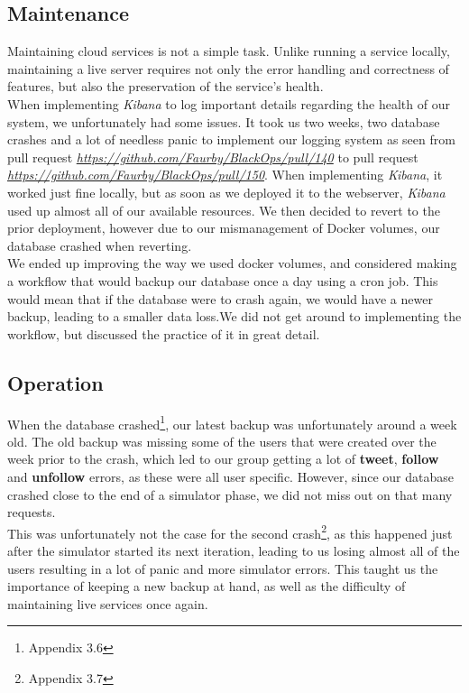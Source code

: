 \subsection{Maintenance}
Maintaining cloud services is not a simple task. Unlike running a service locally, maintaining a live server requires not only the error handling and correctness of features, but also the preservation of the service's health. \\
When implementing \textit{Kibana} to log important details regarding the health of our system, we unfortunately had some issues. It took us two weeks, two database crashes and a lot of needless panic to implement our logging system as seen from pull request \textit{\url{https://github.com/Faurby/BlackOps/pull/140}} to pull request \textit{\url{https://github.com/Faurby/BlackOps/pull/150}}. When implementing \textit{Kibana}, it worked just fine locally, but as soon as we deployed it to the webserver, \textit{Kibana} used up almost all of our available resources. We then decided to revert to the prior deployment, however due to our mismanagement of Docker volumes, our database crashed when reverting. \\
We ended up improving the way we used docker volumes, and considered making a workflow that would backup our database once a day using a cron job. This would mean that if the database were to crash again, we would have a newer backup, leading to a smaller data loss.We did not get around to implementing the workflow, but discussed the practice of it in great detail.



\subsection{Operation}
When the database crashed\footnote{Appendix 3.6}, our latest backup was unfortunately around a week old. The old backup was missing some of the users that were created over the week prior to the crash, which led to our group getting a lot of \textbf{tweet}, \textbf{follow} and \textbf{unfollow} errors, as these were all user specific. However, since our database crashed close to the end of a simulator phase, we did not miss out on that many requests.
\\
This was unfortunately not the case for the second crash\footnote{Appendix 3.7}, as this happened just after the simulator started its next iteration, leading to us losing almost all of the users resulting in a lot of panic and more simulator errors. This taught us the importance of keeping a new backup at hand, as well as the difficulty of maintaining live services once again.


